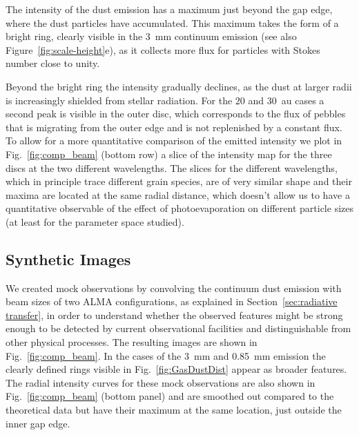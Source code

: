 \documentclass[fleqn,usenatbib]{mnras}
\begin{document}
        The intensity of the dust emission has a maximum just beyond the gap edge, where the dust particles have accumulated. This maximum takes the form of a bright ring, clearly visible in the \SI{3}{mm} continuum emission (see also Figure~\ref{fig:scale-height}e), as it collects more flux for particles with Stokes number close to unity.
        
        Beyond the bright ring the intensity gradually declines, as the dust at larger radii is increasingly shielded from stellar radiation. For the $20$ and \SI{30}{au} cases a second peak is visible in the outer disc, which corresponds to the flux of pebbles that is migrating from the outer edge and is not replenished by a constant flux.
        To allow for a more quantitative comparison of the emitted intensity we plot in Fig.~\ref{fig:comp_beam} (bottom row) a slice of the intensity map for the three discs at the two different wavelengths.
        The slices for the different wavelengths, which in principle trace different grain species, are of very similar shape and their maxima are located at the same radial distance, which doesn't allow us to have a quantitative observable of the effect of photoevaporation on different particle sizes (at least for the parameter space studied).
         
    \subsection{Synthetic Images} \label{sec:synthetic-images}
        We created mock observations by convolving the continuum dust emission with beam sizes of two ALMA configurations, as explained in Section~\ref{sec:radiative transfer}, in order to understand whether the observed features might be strong enough to be detected by current observational facilities and distinguishable from other physical processes. 
        The resulting images are shown in Fig.~\ref{fig:comp_beam}.
        In the cases of the \SI{3}{mm} and \SI{0.85}{mm} emission the clearly defined rings visible in Fig.~\ref{fig:GasDustDist} appear as broader features.
        The radial intensity curves for these mock observations are also shown in Fig.~\ref{fig:comp_beam} (bottom panel) and are smoothed out compared to the theoretical data but have their maximum at the same location, just outside the inner gap edge.
        
\end{document}
